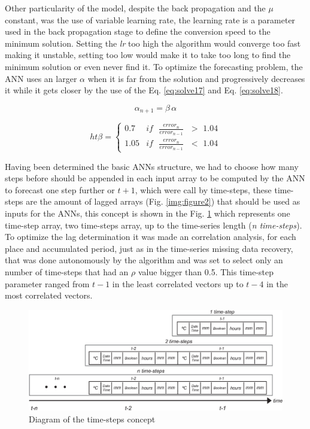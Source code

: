 Other particularity of the model, despite the back propagation and the $\mu$ constant, was the use of variable learning rate, the learning rate is a parameter used in the back propagation stage to define the conversion speed to the minimum solution. Setting the \textit{lr} too high the algorithm would converge too fast making it unstable, setting too low would make it to take too long to find the minimum solution or even never find it. To optimize the forecasting problem, the ANN uses an larger $\alpha$ when it 
is far from the solution and progressively decreases it while it gets closer by the use of the Eq. \ref{eq:solve17} and Eq. \ref{eq:solve18}.

\begin{equation}
\label{eq:solve17}
\alpha_{n + 1} = \beta \, \alpha
\end{equation}

\begin{equation}
\label{eq:solve18}ht
\beta = \begin{cases}
         0.7 & \text{$if$ $\frac{error_n}{error_{n-1}}$ $>$ 1.04}\\
         1.05 & \text{$if$ $\frac{error_n}{error_{n-1}}$ $<$ 1.04}
        \end{cases}
\end{equation}

Having been determined the basic ANNs structure, we had to choose how many steps before should be appended in each input array to be computed by the ANN to forecast one step further or $t + 1$,
which were call by time-steps, these time-steps are the amount of lagged arrays (Fig. \ref{img:figure2}) that should be used as inputs for the ANNs, this concept is shown in the Fig. \ref{img:figure3} which represents one time-step array,  two time-steps array, up to the time-series length (\textit{n time-steps}). To optimize the lag determination it was made an correlation analysis, for each place and accumulated period, just as in the time-series missing data recovery, that was done autonomously by the algorithm and was set to select only an number of time-steps that had an $\rho$  value bigger than 0.5. This time-step parameter ranged from $t-1$ in the least correlated vectors up to $t-4$ in the most correlated vectors.

\begin{figure}[htb!]
 \centering
 \includegraphics[scale=0.88]{capitulo_2/time_steps}
 \caption{Diagram of the time-steps concept }
 \label{img:figure3}
\end{figure}

